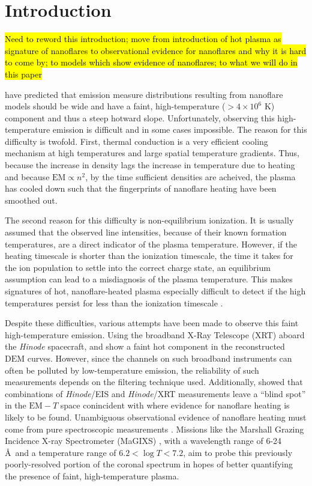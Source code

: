 \documentclass[iop]{emulateapj}
\newcommand{\ang}{\AA~}
\begin{document}
	\section{Introduction}
	\par\hl{Need to reword this introduction; move from introduction of hot plasma as signature of nanoflares to observational evidence for nanoflares and why it is hard to come by; to models which show evidence of nanoflares; to what we will do in this paper}
	\par \citet{cargill_implications_1994,cargill_nanoflare_2004} have predicted that emission measure distributions resulting from nanoflare models should be wide and have a faint, high-temperature ($>4\times10^6$ K) component and thus a steep hotward slope. Unfortunately, observing this high-temperature emission is difficult and in some cases impossible. The reason for this difficulty is twofold. First, thermal conduction is a very efficient cooling mechanism at high temperatures and large spatial temperature gradients. Thus, because the increase in density lags the increase in temperature due to heating and because $\mathrm{EM}\propto n^2$, by the time sufficient densities are acheived, the plasma has cooled down such that the fingerprints of nanoflare heating have been smoothed out. 
	\par The second reason for this difficulty is non-equilibrium ionization. It is usually assumed that the observed line intensities, because of their known formation temperatures, are a direct indicator of the plasma temperature. However, if the heating timescale is shorter than the ionization timescale, the time it takes for the ion population to settle into the correct charge state, an equilibrium assumption can lead to a misdiagnosis of the plasma temperature. This makes signatures of hot, nanoflare-heated plasma especially difficult to detect if the high temperatures persist for less than the ionization timescale \citep{bradshaw_explosive_2006,bradshaw_what_2011,reale_nonequilibrium_2008}.
	\par Despite these difficulties, various attempts have been made to observe this faint high-temperature emission. Using the broadband X-Ray Telescope (XRT) aboard the \textit{Hinode} spacecraft, \citet{schmelz_hinode_2009} and \citet{reale_evidence_2009} show a faint hot component in the reconstructed $\mathrm{DEM}$ curves. However, since the channels on such broadband instruments can often be polluted by low-temperature emission, the reliability of such measurements depends on the filtering technique used. Additionally, \citet{winebarger_defining_2012} showed that combinations of \textit{Hinode}/EIS and \textit{Hinode}/XRT measurements leave a ``blind spot'' in the $\mathrm{EM}-T$ space conincident with where evidence for nanoflare heating is likely to be found. Unambiguous observational evidence of nanoflare heating must come from pure spectroscopic measurements \citep[see][]{brosius_pervasive_2014}. Missions like the Marshall Grazing Incidence X-ray Spectrometer (MaGIXS) \citep{kobayashi_marshall_2011,winebarger_new_2014}, with a wavelength range of 6-24 \ang and a temperature range of $6.2<\log{T}<7.2$, aim to probe this previously poorly-resolved portion of the coronal spectrum in hopes of better quantifying the presence of faint, high-temperature plasma.
\end{document}
